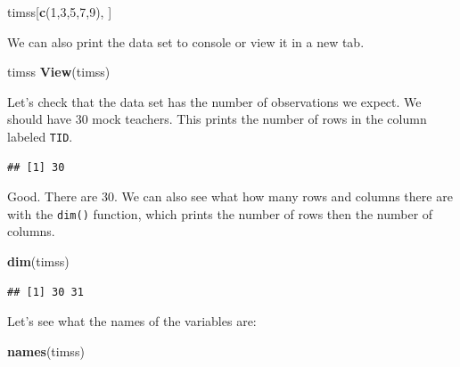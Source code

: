 \documentclass[
]{article}
\newenvironment{Shaded}{\begin{snugshade}}{\end{snugshade}}
\newcommand{\DecValTok}[1]{\textcolor[rgb]{0.00,0.00,0.81}{#1}}
\newcommand{\KeywordTok}[1]{\textcolor[rgb]{0.13,0.29,0.53}{\textbf{#1}}}
\newcommand{\NormalTok}[1]{#1}
\newcommand{\OperatorTok}[1]{\textcolor[rgb]{0.81,0.36,0.00}{\textbf{#1}}}
\begin{document}
\begin{Shaded}
\begin{Highlighting}[]
\NormalTok{timss[}\KeywordTok{c}\NormalTok{(}\DecValTok{1}\NormalTok{,}\DecValTok{3}\NormalTok{,}\DecValTok{5}\NormalTok{,}\DecValTok{7}\NormalTok{,}\DecValTok{9}\NormalTok{), ]}
\end{Highlighting}
\end{Shaded}

We can also print the data set to console or view it in a new tab.

\begin{Shaded}
\begin{Highlighting}[]
\NormalTok{timss}
\KeywordTok{View}\NormalTok{(timss)}
\end{Highlighting}
\end{Shaded}

Let's check that the data set has the number of observations we expect. We should have 30 mock teachers. This prints the number of rows in the column labeled \texttt{TID}.

\begin{Shaded}
\end{Shaded}

\begin{verbatim}
## [1] 30
\end{verbatim}

Good. There are 30. We can also see what how many rows and columns there are with the \texttt{dim()} function, which prints the number of rows then the number of columns.

\begin{Shaded}
\begin{Highlighting}[]
\KeywordTok{dim}\NormalTok{(timss)}
\end{Highlighting}
\end{Shaded}

\begin{verbatim}
## [1] 30 31
\end{verbatim}

Let's see what the names of the variables are:

\begin{Shaded}
\begin{Highlighting}[]
\KeywordTok{names}\NormalTok{(timss)}
\end{Highlighting}
\end{Shaded}
\end{document}
